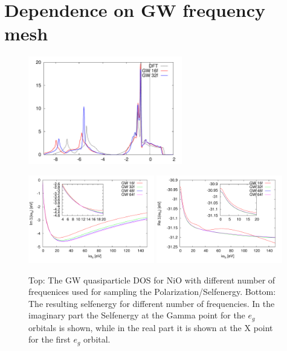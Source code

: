 \documentclass[12pt,a4paper]{scrartcl}
\numberwithin{equation}{section}
\begin{document}
\clearpage


\section{Dependence on GW frequency mesh}
\begin{figure}[h]
\begin{center}
\includegraphics[width=0.6\textwidth]{figs/freqdep/NiO_fcomp_DOS.pdf} 
\end{center}
\includegraphics[width=0.49\textwidth]{figs/freqdep/NiO_fcomp_sigmai.pdf}
\includegraphics[width=0.49\textwidth]{figs/freqdep/NiO_fcomp_sigmar.pdf}
\caption{Top: The GW quasiparticle DOS for NiO with different number of
frequenices used for sampling the Polarization/Selfenergy.
Bottom: The resulting selfenergy for different number of frequencies. In the imaginary
part the Selfenergy at the Gamma point for the $e_g$ orbitals is shown, while
in the real part it is shown at the X point for the first $e_g$ orbital.}
\label{fig:gw_freqdep_comp}
\end{figure}
\end{document}
